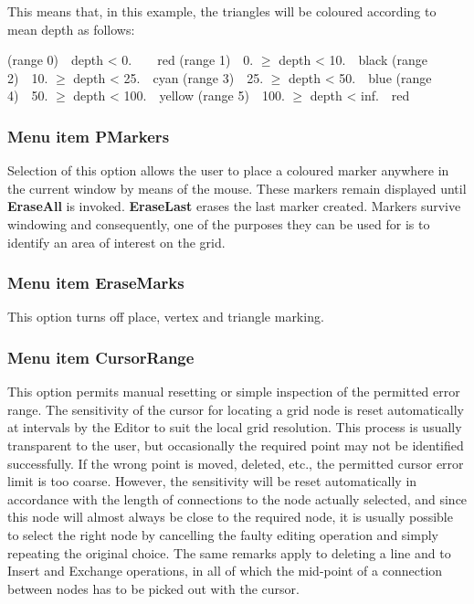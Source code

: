\documentclass{article}
\begin{document}
This means that, in this example, the triangles will be coloured according to mean depth as follows:

(range 0)\ \ depth {\textless} 0.\ \ \ \ red\newline
(range 1)\ \ 0. ${\geq}$ depth {\textless} 10.\ \ black\newline
(range 2)\ \ 10. ${\geq}$ depth {\textless} 25.\ \ cyan\newline
(range 3)\ \ 25. ${\geq}$ depth {\textless} 50.\ \ blue\newline
(range 4)\ \ 50. ${\geq}$ depth {\textless} 100.\ \ yellow\newline
(range 5)\ \ 100. ${\geq}$ depth {\textless} inf.\ \ red

\subsubsection{Menu item PMarkers}
Selection of this option allows the user to place a coloured marker anywhere in the current window by means of the mouse. These markers remain displayed until \textbf{EraseAll} is invoked. \textbf{EraseLast} erases the last marker created. Markers survive windowing and consequently, one of the purposes they can be used for is to identify an area of interest on the grid.

\subsubsection{Menu item EraseMarks}
This option turns off place, vertex and triangle marking.

\subsubsection[Menu item CursorRange]{Menu item CursorRange}
This option permits manual resetting or simple inspection of the permitted error range. The sensitivity of the cursor for locating a grid node is reset automatically at intervals by the Editor to suit the local grid resolution. This process is usually transparent to the user, but occasionally the required point may not be identified successfully. If the wrong point is moved, deleted, etc., the permitted cursor error limit is too coarse. However, the sensitivity will be reset automatically in accordance with the length of connections to the node actually selected, and since this node will almost always be close to the required node, it is usually possible to select the right node by cancelling the faulty editing operation and simply repeating the original choice. The same remarks apply to deleting a line and to Insert and Exchange operations, in all of which the mid-point of a connection between nodes has to be picked out with the cursor.
\end{document}
